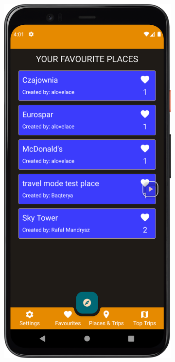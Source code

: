         \begin{figure}[H]
            \centering
            \begin{subfigure}[b]{0.3\textwidth}
                \centering
                \includegraphics[width=\textwidth]{src/app/fav_places.png}

\end{subfigure}
\end{figure}
